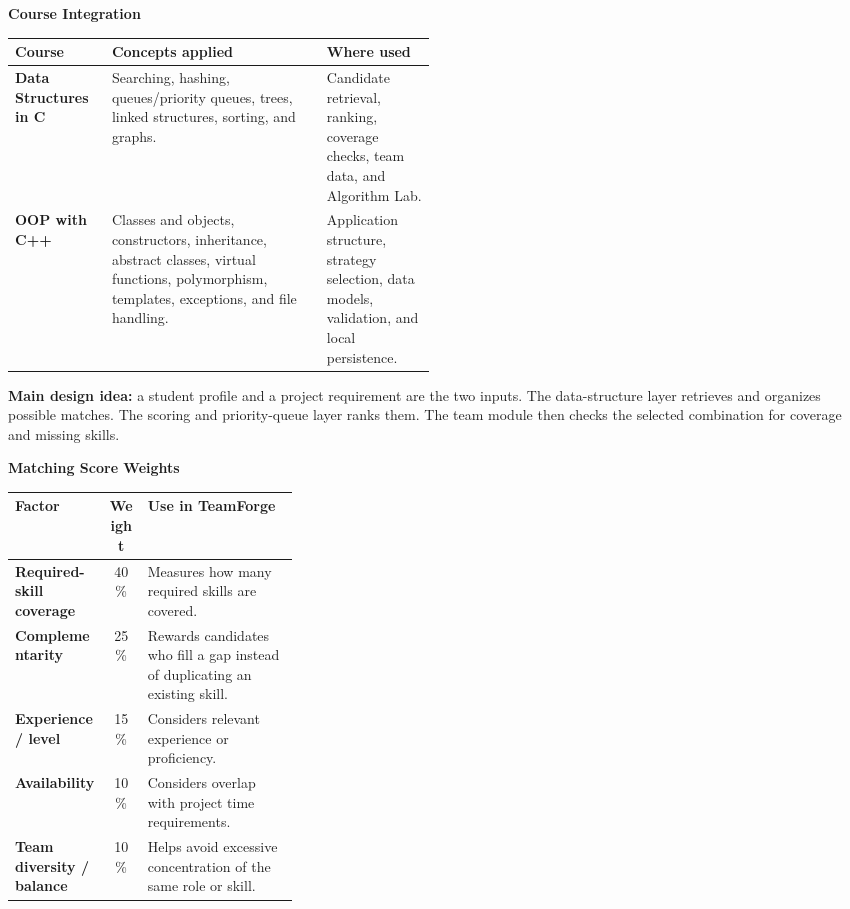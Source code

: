 \documentclass[a4paper,11pt]{article}
\begin{document}
\vspace{10pt}
\begin{answerbox}
\textbf{Course Integration}

\vspace{3pt}
\begin{tabularx}{\linewidth}{|>{\bfseries}p{0.23\linewidth}|X|p{0.26\linewidth}|}
\hline
Course & Concepts applied & Where used \\
\hline
Data Structures in C & Searching, hashing, queues/priority queues, trees, linked structures, sorting, and graphs. & Candidate retrieval, ranking, coverage checks, team data, and Algorithm Lab. \\
\hline
OOP with C++ & Classes and objects, constructors, inheritance, abstract classes, virtual functions, polymorphism, templates, exceptions, and file handling. & Application structure, strategy selection, data models, validation, and local persistence. \\
\hline
\end{tabularx}

\vspace{5pt}
\begin{softbox}
\textbf{Main design idea:} a student profile and a project requirement are the two inputs. The data-structure layer retrieves and organizes possible matches. The scoring and priority-queue layer ranks them. The team module then checks the selected combination for coverage and missing skills.
\end{softbox}
\end{answerbox}

\vspace{10pt}
\begin{answerbox}
\textbf{Matching Score Weights}

\vspace{3pt}
\begin{tabularx}{\linewidth}{|>{\bfseries}p{0.33\linewidth}|c|X|}
\hline
Factor & Weight & Use in TeamForge \\
\hline
Required-skill coverage & 40\% & Measures how many required skills are covered. \\
\hline
Complementarity & 25\% & Rewards candidates who fill a gap instead of duplicating an existing skill. \\
\hline
Experience / level & 15\% & Considers relevant experience or proficiency. \\
\hline
Availability & 10\% & Considers overlap with project time requirements. \\
\hline
Team diversity / balance & 10\% & Helps avoid excessive concentration of the same role or skill. \\
\hline
\end{tabularx}
\end{answerbox}
\end{document}
